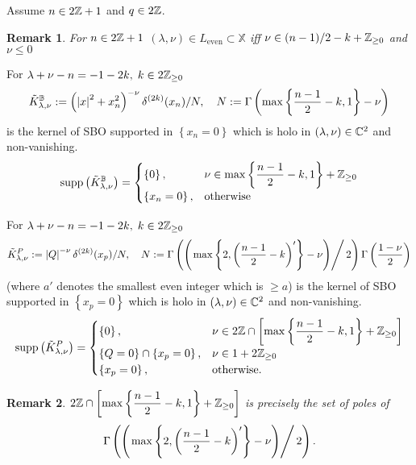\documentclass[8pt,pdf,notes]{beamer}
\theoremstyle{mystyle}
\newtheorem*{remark}{Remark}
\begin{document}
\begin{frame}
	Assume $n\in2\mathbb{Z}+1$ and $q\in2\mathbb{Z}$.
	\begin{remark}
	{For $n\in2\mathbb{Z}+1$ $\left( \lambda,\nu \right)\in L_{\mbox{even}}\subset\mathbb{X}$
	iff $\nu\in(n-1)/2-k+\mathbb{Z}_{\ge0}$ and $\nu\le0$}
	\end{remark}
	\begin{theorem}
		For $\lambda+\nu-n=-1-2k,\;k\in2\mathbb{Z}_{\ge0}$
		 \[\tilde{K}_{\lambda,\nu}^{\mathbb{B}}
			:=\left( \myabs{x}^2+x_n^2 \right)^{-\nu}\delta^{(2k)}(x_n)/N,\quad
		N:=
		\Gamma\left( \max\left\{\frac{n-1}{2}-k,1  \right\}-\nu \right)
		\]
		is the kernel of SBO supported in $\left\{ x_n=0 \right\}$ which is holo in $(\lambda,\nu)\in\mathbb{C}^2$ and
		non-vanishing. 
		\[
			\supp\left( \tilde{K}_{\lambda,\nu}^{\mathbb{B}} \right)=
			\begin{cases}
				\left\{ 0 \right\},&\nu\in\max\left\{\frac{n-1}{2}-k,1  \right\}+\Z_{\ge0}\\
				\left\{ x_n=0 \right\},&\mbox{otherwise}
			\end{cases}
		\]
	\end{theorem}
\end{frame}
\begin{frame}
	\begin{theorem}[$G:=O(p+1,q+1),\;n:=p+q$]
		For $\lambda+\nu-n=-1-2k,\;k\in2\mathbb{Z}_{\ge0}$
		\[\tilde{K}_{\lambda,\nu}^P:=\myabs{Q}^{-\nu}\delta^{(2k)}(x_p)/N,\quad N:=
		\Gamma\left(\mybra{\left.\max\left\{ 2,\left( \frac{n-1}{2}-k \right)' \right\}-\nu}\right/2\right)
		\Gamma\left( \frac{1-\nu}{2} \right)\]
		(where $a'$ denotes the smallest even integer which is $\ge a$)
		is the kernel of SBO supported in $\left\{ x_p=0 \right\}$ which is holo in $(\lambda,\nu)\in\mathbb{C}^2$ and
		non-vanishing. 
		\[
			\supp\left( \tilde{K}_{\lambda,\nu}^P \right)=\begin{cases}
				\left\{0 \right\},&\nu\in 2\Z\cap\left[\max\left\{ \frac{n-1}{2}-k ,1\right\}+\Z_{\ge0}\right]\\
				\left\{ Q=0 \right\}\cap\left\{ x_p=0 \right\},&\nu\in1+2\Z_{\ge0}\\
				\left\{ x_p=0 \right\},&\mbox{otherwise}.
			\end{cases}
		\]
	\end{theorem}
	\begin{remark}
		$2\Z\cap\left[\max\left\{ \frac{n-1}{2}-k ,1\right\}+\Z_{\ge0}\right]$ is precisely the set of poles of
		\[\Gamma\left(\mybra{\left.\max\left\{ 2,\left( \frac{n-1}{2}-k \right)' \right\}-\nu}\right/2\right).\]
	\end{remark}
\end{frame}
\end{document}
